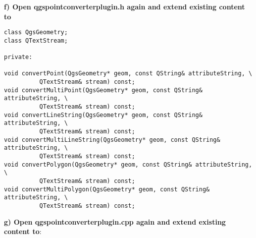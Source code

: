 \textbf{f) Open qgspointconverterplugin.h again and extend existing content to}

\begin{verbatim}
class QgsGeometry;
class QTextStream;

private:

void convertPoint(QgsGeometry* geom, const QString& attributeString, \
		  QTextStream& stream) const;
void convertMultiPoint(QgsGeometry* geom, const QString& attributeString, \
		  QTextStream& stream) const;
void convertLineString(QgsGeometry* geom, const QString& attributeString, \
		  QTextStream& stream) const;
void convertMultiLineString(QgsGeometry* geom, const QString& attributeString, \
		  QTextStream& stream) const;
void convertPolygon(QgsGeometry* geom, const QString& attributeString, \
		  QTextStream& stream) const;
void convertMultiPolygon(QgsGeometry* geom, const QString& attributeString, \
		  QTextStream& stream) const;
\end{verbatim}

\textbf{g) Open qgspointconverterplugin.cpp again and extend existing content to}:

